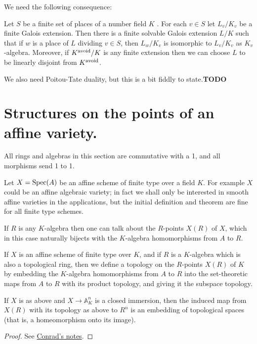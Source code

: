 We need the following consequence:

\begin{theorem} Let $S$ be a finite set of places of a number field $K$ . For each $v \in S$
let $L_v/K_v$ be a finite Galois extension. Then there is a finite solvable Galois extension
$L/K$ such that if $w$ is a place of $L$ dividing $v \in S$, then $L_w/K_v$ is isomorphic to $L_v/K_v$ as $K_v$-algebra. Moreover, if $K^{\operatorname{avoid}} /K$ is
any finite extension then we can choose $L$ to be linearly disjoint from $K^{\operatorname{avoid}}$.
\end{theorem}

We also need Poitou-Tate duality, but this is a bit fiddly to state.{\bf TODO}

\section{Structures on the points of an affine variety.}

All rings and algebras in this section are commutative with a 1, and all morphisms send 1 to 1.

Let $X=\operatorname{Spec}(A)$ be an affine scheme of finite type over a field $K$. For example $X$ could be an affine algebraic variety; in fact we shall only be interested in smooth affine varieties in the applications, but the initial definition and theorem are fine for all finite type schemes.

If $R$ is any $K$-algebra then one can talk about the $R$-points $X(R)$ of $X$, which in this case
naturally bijects with the $K$-algebra homomorphisms from $A$ to $R$.

\begin{definition}\label{topology_on_affine_variety_points} If $X$ is an affine scheme of finite
    type over $K$, and if $R$ is a $K$-algebra which is also a topological ring, then we define a topology on the $R$-points $X(R)$ of $K$ by embedding the $K$-algebra homomorphisms from $A$ to $R$ into the set-theoretic maps from $A$ to $R$ with its product topology, and giving it the subspace topology.
\end{definition}

\begin{theorem}\label{topology_on_affine_variety_computation}
    If $X$ is as above and $X\to\mathbb{A}^n_K$ is a closed immersion, then the induced map from $X(R)$ with its topology as above to $R^n$ is an embedding of topological spaces (that is, a homeomorphism onto its image).
\end{theorem}
\begin{proof} See \href{https://math.stanford.edu/~conrad/papers/adelictop.pdf}{Conrad's notes}.
\end{proof}

